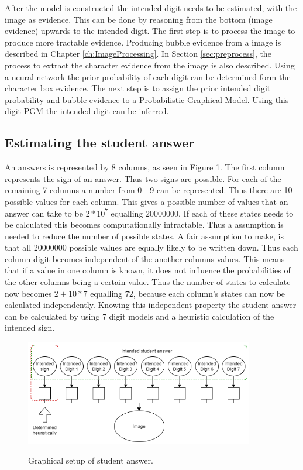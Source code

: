 After the model is constructed the intended digit needs to be estimated, with the image as evidence. This can be done by reasoning from the bottom (image evidence) upwards to the intended digit. The first step is to process the image to produce more tractable evidence. Producing bubble evidence from a image is described in Chapter \ref{ch:ImageProcessing}. In Section \ref{sec:preprocess}, the process to extract the character evidence from the image is also described. Using a neural network the prior probability of each digit can be determined form the character box evidence. The next step is to assign the prior intended digit probability and bubble evidence to a Probabilistic Graphical Model. Using this digit PGM the intended digit can be inferred.

\subsection{Estimating the student answer}
\label{sec:studentAnswer}

An answers is represented by 8 columns, as seen in Figure \ref{fig:stdAns}. The first column represents the sign of an answer. Thus two signs are possible. For each of the remaining 7 columns a number from 0 - 9 can be represented. Thus there are 10 possible values for each column. This gives a possible number of values that an answer can take to be $2*10^7$ equalling $20 000 000$. If each of these states needs to be calculated this becomes computationally intractable. Thus a assumption is needed to reduce the number of possible states. A fair assumption to make, is that all $20 000 000$ possible values are equally likely to be written down. Thus each column digit becomes independent of the another columns values. This means that if a value in one column is known, it does not influence the probabilities of the other columns being a certain value. Thus the number of states to calculate now becomes $2+10*7$ equalling $72$, because each column's states can now be calculated independently. Knowing this independent property the student answer can be calculated by using 7 digit models and a heuristic calculation of the intended sign.

\begin{figure}
  \centering
  \includegraphics[width=10cm]{ans}\\
  \caption{Graphical setup of student answer.}
  \label{fig:stdAns}
\end{figure}


